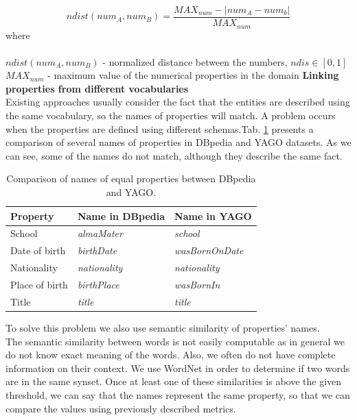 \documentclass{llncs}
\begin{document}
\begin{equation}
ndist(num_A, num_B)= \frac {MAX_{num} - |num_A - num_b|}{MAX_{num}}
\label{rov3}
\end{equation}
where\\
\vspace{5mm} \\
$ndist(num_A, num_B)$ - normalized distance between the numbers, $ ndis \in [0, 1]$
$MAX_{num}$ - maximum value of the numerical properties in the domain
\vspace{8mm} 
\newline
\textbf{Linking properties from different vocabularies}\newline
\vspace{1.5mm} \\
Existing approaches usually consider the fact that the entities are described
using the same vocabulary, so the names of properties will match. A problem
occurs when the properties are defined using different schemas.Tab. \ref{tab2} presents
a comparison of several names of properties in DBpedia and YAGO datasets. As
we can see, some of the names do not match, although they describe the same
fact. 
\begin{table}
\centering
\renewcommand\tablename{Table}
\caption{Comparison of names of equal properties between DBpedia and YAGO.}
\label{tab2}
\begin{tabular}{|l|l|l|}
\hline
\textbf{Property} & \textbf{Name in DBpedia} & \textbf{Name in YAGO}  \\ \hline
School            & \textit{almaMater}       & \textit{school}        \\ \hline
Date of birth     & \textit{birthDate}       & \textit{wasBornOnDate} \\ \hline
Nationality       & \textit{nationality}     & \textit{nationality}   \\ \hline
Place of birth    & \textit{birthPlace}      & \textit{wasBornIn}     \\ \hline
Title             & \textit{title}           & \textit{title}         \\ \hline
\end{tabular}
\end{table}
To solve this problem we also use semantic similarity of properties' names.\\
The semantic similarity between words is not easily computable as in general we
do not know exact meaning of the words. Also, we often do not have complete
information on their context. We use WordNet in order to determine if two words
are in the same synset. Once at least one of these similarities is above the given
threshold, we can say that the names represent the same property, so that we
can compare the values using previously described metrics.
\end{document}
